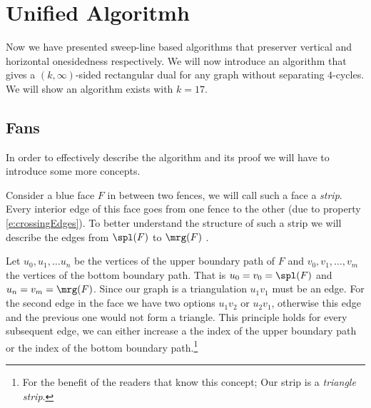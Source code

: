 
\newenvironment{invariants}{%
  \refstepcounter{thrm}%
  \paragraph{Invariants~\theprop}%
  \renewcommand*{\theenumi}{\theprop\,(I\arabic{enumi})}%
  \renewcommand*{\labelenumi}{(I\arabic{enumi})}%
  \enumerate
}{%
  \endenumerate
}

\section{Unified Algoritmh}

Now we have presented sweep-line based algorithms that preserver vertical and horizontal onesidedness respectively. We will now introduce an algorithm that gives a $(k,\infty)$-sided rectangular dual for any graph without separating $4$-cycles. We will show an algorithm exists with $k=17$.





 \subsection{Fans}
 In order to effectively describe the algorithm and its proof we will have to introduce some more concepts.

 Consider a blue face $F$ in between two fences, we will call such a face a \emph{strip}. Every interior edge of this face goes from one fence to the other (due to property \ref{e:crossingEdges}). To better understand the structure of such a strip we will describe the edges from $\spl(F)$ to $\mrg(F)$ .

 Let $u_0 , u_1, \ldots u_n$ be the vertices of the upper boundary path of $F$ and $v_0, v_1, \ldots, v_m$ the vertices of the bottom boundary path. That is $u_0=v_0 = \spl(F)$ and $u_n = v_m = \mrg(F)$. Since our graph is a triangulation $u_1v_1$ must be an edge. For the second edge in the face we have two options $u_1v_2$ or $u_2v_1$, otherwise this edge and the previous one would not form a triangle. This principle holds for every subsequent edge, we can either increase a the index of the upper boundary path or the index of the bottom boundary path.\footnote{For the benefit of the readers that know this concept; Our strip is a \emph{triangle strip}.}

